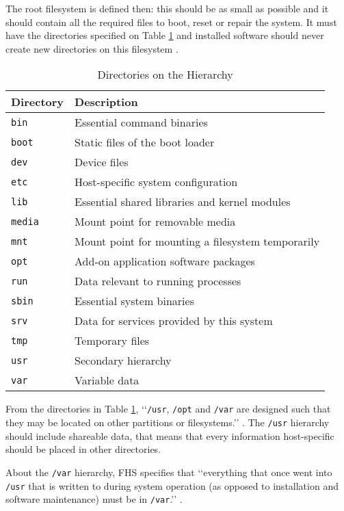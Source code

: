 The root filesystem is defined then: this should be as small as possible and it should contain all the required files to boot, reset or repair the system. It must have the directories specified on Table \ref{tab:directories} and installed software should never create new directories on this filesystem \cite{allbery2015filesystem}.


\begin{table}[h!]
\centering
\caption{Directories on the Hierarchy \cite{allbery2015filesystem}}
\label{tab:directories}
\begin{tabular}{ll}
\toprule
\textbf{Directory} & \textbf{Description} \\
\midrule
\texttt{bin} & Essential command binaries \\
\texttt{boot} & Static files of the boot loader \\
\texttt{dev} & Device files \\
\texttt{etc} & Host-specific system configuration \\
\texttt{lib} & Essential shared libraries and kernel modules \\
\texttt{media} & Mount point for removable media \\
\texttt{mnt} & Mount point for mounting a filesystem temporarily \\
\texttt{opt} & Add-on application software packages \\
\texttt{run} & Data relevant to running processes \\
\texttt{sbin} & Essential system binaries \\
\texttt{srv} & Data for services provided by this system \\
\texttt{tmp} & Temporary files \\
\texttt{usr} & Secondary hierarchy \\
\texttt{var} & Variable data \\
\bottomrule
\end{tabular}
\end{table}


From the directories in Table \ref{tab:directories}, \lq\lq \texttt{/usr}, \texttt{/opt} and \texttt{/var} are designed such that they may be located on other partitions or filesystems.\rq\rq{} \cite[p. 3]{allbery2015filesystem}. The \texttt{/usr} hierarchy should include shareable data, that means that every information host-specific should be placed in other directories.

About the \texttt{/var} hierarchy, FHS specifies that \lq\lq everything that once went into \texttt{/usr} that is written to during system operation (as opposed to installation and software maintenance) must be in \texttt{/var}.\rq\rq{}  \cite[p. 30]{allbery2015filesystem}.


